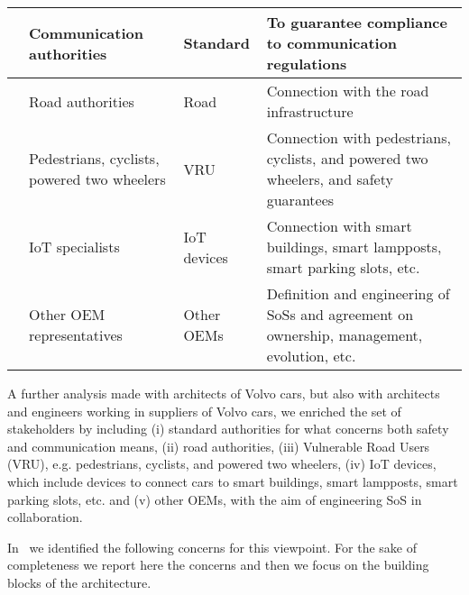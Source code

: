 \begin{table}[htb!]
\begin{tabular}{rv{0.2\textwidth}v{0.26\textwidth}v{0.42\textwidth}}
& Communication authorities  &  Standard &	To guarantee compliance to communication regulations \tabularnewline
\hline
& Road authorities  &  Road &	Connection with the road infrastructure \tabularnewline
\hline
& Pedestrians, cyclists, powered two wheelers  &  VRU &	Connection with pedestrians, cyclists, and powered two wheelers, and safety guarantees \tabularnewline
\hline
& IoT specialists  &  IoT devices &	Connection with smart buildings, smart lampposts, smart parking slots, etc. \tabularnewline
\hline
& Other OEM representatives  &  Other OEMs &	Definition and engineering of SoSs and agreement on ownership, management, evolution, etc. \tabularnewline
\bottomrule
\end{tabular}
\end{table}

A further analysis made with architects of Volvo cars, but also with architects and engineers working in suppliers of Volvo cars, we enriched the set of stakeholders by including (i) standard authorities for what concerns both safety and communication means, (ii) road authorities, (iii) Vulnerable Road Users (VRU), e.g. pedestrians, cyclists, and powered two wheelers, (iv) IoT devices, which include devices to connect cars to smart buildings, smart lampposts, smart parking slots, etc. and (v) other OEMs, with the aim of engineering SoS in collaboration.







In~\cite{JSA2017} we identified the following concerns for this viewpoint. For the sake of completeness we report here the concerns and then we focus on the building blocks of the architecture.

